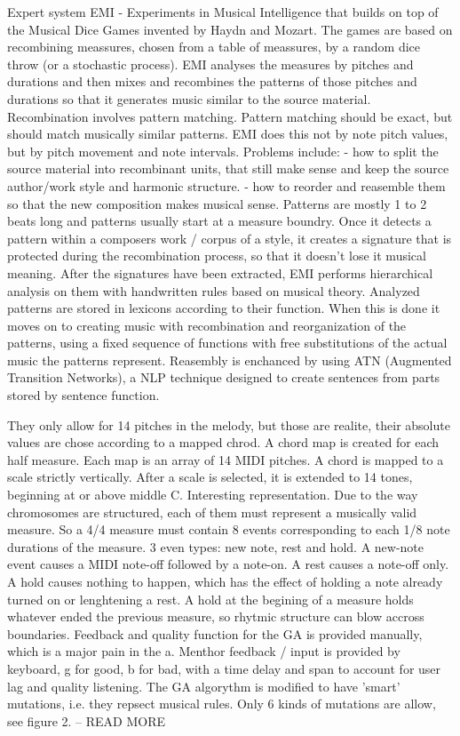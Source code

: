 \cite{Cope1991} Expert system EMI - Experiments in Musical Intelligence that builds on top of the Musical Dice Games invented by Haydn and Mozart. The games are based on recombining meassures, chosen from a table of meassures, by a random dice throw (or a stochastic process). EMI analyses the measures by pitches and durations and then mixes and recombines the patterns of those pitches and durations so that it generates music similar to the source material. Recombination involves pattern matching. Pattern matching should be exact, but should match musically similar patterns. EMI does this not by note pitch values, but by pitch movement and note intervals. Problems include: - how to split the source material into recombinant units, that still make sense and keep the source author/work style and harmonic structure. - how to reorder and reasemble them so that the new composition makes musical sense. Patterns are mostly 1 to 2 beats long and patterns usually start at a measure boundry. Once it detects a pattern within a composers work / corpus of a style, it creates a signature that is protected during the recombination process, so that it doesn't lose it musical meaning. After the signatures have been extracted, EMI performs hierarchical analysis on them with handwritten rules based on musical theory. Analyzed patterns are stored in lexicons according to their function. When this is done it moves on to creating music with recombination and reorganization of the patterns, using a fixed sequence of functions with free substitutions of the actual music the patterns represent. Reasembly is enchanced by using ATN (Augmented Transition Networks), a NLP technique designed to create sentences from parts stored by sentence function.

\cite{Biles1994} They only allow for 14 pitches in the melody, but those are realite, their absolute values are chose according to a mapped chrod. A chord map is created for each half measure. Each map is an array of 14 MIDI pitches. A chord is mapped to a scale strictly vertically. After a scale is selected, it is extended to 14 tones, beginning at or above middle C. Interesting representation. Due to the way chromosomes are structured, each of them must represent a musically valid measure. So a 4/4 measure must contain 8 events corresponding to each 1/8 note durations of the measure. 3 even types: new note, rest and hold. A new-note event causes a MIDI note-off followed by a note-on. A rest causes a note-off only. A hold causes nothing to happen, which has the effect of holding a note already turned on or lenghtening a rest. A hold at the begining of a measure holds whatever ended the previous measure, so rhytmic structure can blow accross boundaries. Feedback and quality function for the GA is provided manually, which is a major pain in the a. Menthor feedback / input is provided by keyboard, g for good, b for bad, with a time delay and span to account for user lag and quality listening. The GA algorythm is modified to have 'smart' mutations, i.e. they repsect musical rules. Only 6 kinds of mutations are allow, see figure 2. -- READ MORE

